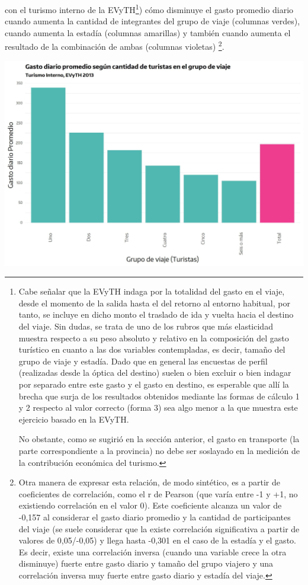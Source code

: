 \documentclass[
]{book}
\begin{document}
con el turismo interno de la EVyTH\footnote{Cabe señalar que la EVyTH indaga por la totalidad del gasto en el viaje, desde el momento de la salida hasta el del retorno al entorno habitual, por tanto, se incluye en dicho monto el traslado de ida y vuelta hacia el destino del viaje. Sin dudas, se trata de uno de los rubros que más elasticidad muestra respecto a su peso absoluto y relativo en la composición del gasto turístico en cuanto a las dos variables contempladas, es decir, tamaño del grupo de viaje y estadía. Dado que en general las encuestas de perfil (realizadas desde la óptica del destino) suelen o bien excluir o bien indagar por separado entre este gasto y el gasto en destino, es esperable que allí la brecha que surja de los resultados obtenidos mediante las formas de cálculo 1 y 2 respecto al valor correcto (forma 3) sea algo menor a la que muestra este ejercicio basado en la EVyTH.~

  No obstante, como se sugirió en la sección anterior, el gasto en transporte (la parte correspondiente a la provincia) no debe ser soslayado en la medición de la contribución económica del turismo.}) cómo disminuye el gasto promedio diario cuando aumenta la cantidad de integrantes del grupo de viaje (columnas verdes), cuando aumenta la estadía (columnas amarillas) y también cuando aumenta el resultado de la combinación de ambas (columnas violetas) \footnote{Otra manera de expresar esta relación, de modo sintético, es a partir de coeficientes de correlación, como el r de Pearson (que varía entre -1 y +1, no existiendo correlación en el valor 0). Este coeficiente alcanza un valor de -0,157 al considerar el gasto diario promedio y la cantidad de participantes del viaje (se suele considerar que la existe correlación significativa a partir de valores de 0,05/-0,05) y llega hasta -0,301 en el caso de la estadía y el gasto. Es decir, existe una correlación inversa (cuando una variable crece la otra disminuye) fuerte entre gasto diario y tamaño del grupo viajero y una correlación inversa muy fuerte entre gasto diario y estadía del viaje.}.

\begin{center}\includegraphics[width=1\linewidth,height=1\textheight]{imagenes/DT4_grafico18_a} \end{center}
\end{document}

